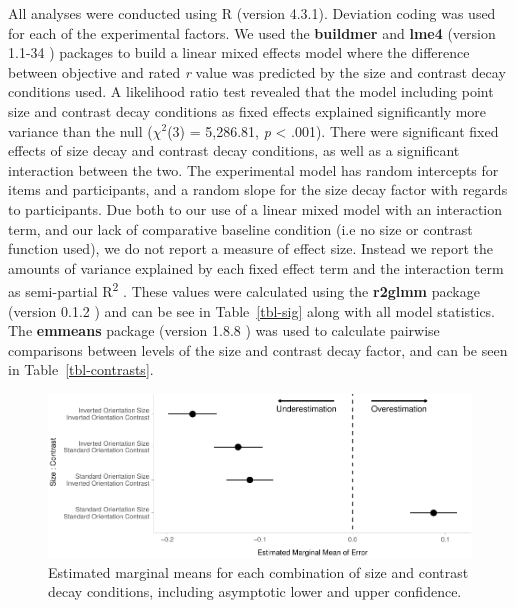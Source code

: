\documentclass[manuscript, anonymous, screen]{acmart}
\begin{document}
All analyses were conducted using R (version 4.3.1). Deviation coding
was used for each of the experimental factors. We used the
\textbf{buildmer} and \textbf{lme4} (version 1.1-34 \citep{lme4})
packages to build a linear mixed effects model where the difference
between objective and rated \emph{r} value was predicted by the size and
contrast decay conditions used. A likelihood ratio test revealed that
the model including point size and contrast decay conditions as fixed
effects explained significantly more variance than the null
(\(\chi^2\)(3) = 5,286.81, \emph{p} \textless{} .001). There were
significant fixed effects of size decay and contrast decay conditions,
as well as a significant interaction between the two. The experimental
model has random intercepts for items and participants, and a random
slope for the size decay factor with regards to participants. Due both
to our use of a linear mixed model with an interaction term, and our
lack of comparative baseline condition (i.e no size or contrast function
used), we do not report a measure of effect size. Instead we report the
amounts of variance explained by each fixed effect term and the
interaction term as semi-partial R\textsuperscript{2}
\citep{nakagawa_2013}. These values were calculated using the
\textbf{r2glmm} package (version 0.1.2 \citep{r2glmm}) and can be see in
Table~\ref{tbl-sig} along with all model statistics. The
\textbf{emmeans} package (version 1.8.8 \citep{emmeans}) was used to
calculate pairwise comparisons between levels of the size and contrast
decay factor, and can be seen in Table~\ref{tbl-contrasts}.

\begin{figure}

{\centering \includegraphics[width=1\textwidth,height=\textheight]{size_and_contrast_new_files/figure-pdf/fig-emm-plot-1.pdf}

}

\caption{\label{fig-emm-plot}Estimated marginal means for each
combination of size and contrast decay conditions, including asymptotic
lower and upper confidence.}

\end{figure}
\end{document}
